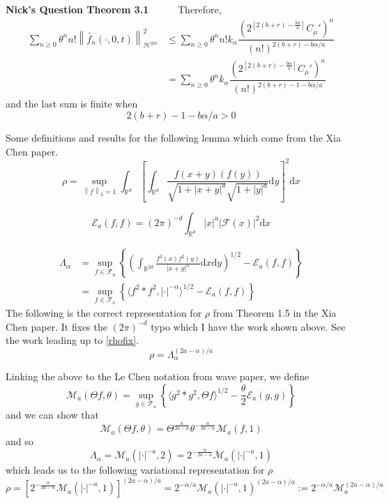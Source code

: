 \documentclass[a4paper,11pt]{article}
\numberwithin{equation}{section}
\theoremstyle{plain}
\theoremstyle{definition}
\newcommand{\ud}{\ensuremath{\mathrm{d} }}
\newcommand{\Norm}[1]{\left\|  #1   \right\|}
\newcommand{\R}{\mathbb{R}}
\newcounter{NQ}
\newenvironment{NickQuestion}[1][] %
{\refstepcounter{NQ}
	\begin{mdframed}[backgroundcolor=lightgray]\textbf{Nick's Question \theNQ \: #1~~}~~~\noindent}%
	{\end{mdframed}}
\numberwithin{NQ}{section}
\numberwithin{LQ}{section}
\numberwithin{ZQ}{section}
\begin{document}
\begin{NickQuestion}[Theorem 3.1]
		Therefore,
		\begin{align*}
		\sum_{n \ge 0} \theta^n n! \Norm{ \tilde{f_n}(\cdot,0,t) }_{ \mathcal{H}^{\otimes n} }^2 & \le \sum_{n \ge 0} \theta^n n!  k_{\alpha} \dfrac{ \left(2^{ \left[ 2(b+r)- \frac{b \alpha}{a} \right]}C_\mu' \right)^n }{ (n!)^{ 2(b+r) - b\alpha/a } }
		\\& =  \sum_{n \ge 0} \theta^n   k_{\alpha} \dfrac{ \left(2^{ \left[ 2(b+r)- \frac{b \alpha}{a} \right]}C_\mu' \right)^n }{ (n!)^{ 2(b+r) - 1 - b\alpha/a } }
		\end{align*}
		and the last sum is finite when
		\begin{equation}\label{alpha4}
		2(b+r) - 1 - b\alpha/a > 0
		\end{equation}
	\end{NickQuestion}
	Some definitions and results for the following lemma which come from the Xia Chen paper.
	\[
	\rho = \sup_{\Norm{f}_2 =1} \int_{\R^d}\left[ \int_{\R^d} \frac{f(x+y)(f(y))}{\sqrt{1+|x+y|^a}\sqrt{1+|y|^a}} \ud y \right]^2 \ud x
	\]

	\[
	\mathcal{E}_a(f,f) = (2 \pi)^{-d}\int_{\R^d} |x|^a |\mathcal{F}(x)|^2 \ud x
	\]

	\begin{align*}
	\Lambda_{\alpha} &= \sup_{f\in \mathcal{F}_a} \left\{ \left( \int_{\R^{2d}} \frac{f^2(x)f^2(y)}{|x+y|^\alpha} \ud x \ud y \right)^{1/2} - \mathcal{E}_a(f,f) \right\}
	\\&= \sup_{f\in \mathcal{F}_a} \left\{ \langle f^2*f^2, |\cdot|^{-\alpha} \rangle^{1/2} - \mathcal{E}_a(f,f) \right\}
	\end{align*}
	The following is the correct representation for $\rho$ from Theorem 1.5 in the Xia Chen paper. It fixes the $(2\pi)^{-d}$ typo which I have the work shown above. See the work leading up to \ref{rhofix}.
	\[
	\rho =\Lambda_{\alpha}^{(2a-\alpha)/a}
	\]

	Linking the above to the Le Chen notation from wave paper, we define
	\[
	\mathcal{M}_a(\Theta f,\theta) = \sup_{g \in \mathcal{F}_a} \left\{ \langle g^2 * g^2, \Theta f \rangle^{1/2} - \frac{\theta}{2} \mathcal{E}_a(g,g) \right\}
	\]
	and we can show that
	\[
	\mathcal{M}_a(\Theta f,\theta) = \Theta^{\frac{{a}}{2a-\alpha}}\theta^{-\frac{\alpha}{2a-\alpha}}	\mathcal{M}_a( f,1)
	\]
	and so
	\[
	\Lambda_{\alpha} = 	\mathcal{M}_a( |\cdot|^{-a},2) = 2^{-\frac{\alpha}{2a-\alpha}}\mathcal{M}_a(  |\cdot|^{-a},1)
	\]
	which leads us to the following variational representation for $\rho$
	\begin{equation}\label{rhorep}
	\rho = \left[ 2^{-\frac{\alpha}{2a-\alpha}}\mathcal{M}_a(  |\cdot|^{-a},1) \right]^{(2a-\alpha)/a} = 2^{-\alpha/a}\mathcal{M}_a( |\cdot|^{-a},1)^{(2a-\alpha)/a} :=    2^{-\alpha/a}\mathcal{M}_a^{(2a-\alpha)/a}
	\end{equation}
\end{document}
